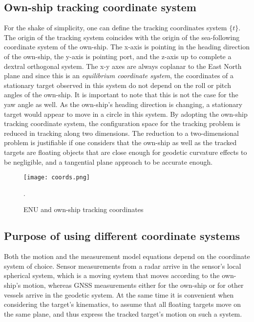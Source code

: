 \subsection{Own-ship tracking coordinate system}


For the shake of simplicity, one can define the tracking coordinates system $\{t\}$. The origin of the tracking system coincides with the origin of the sea-following coordinate system of the own-ship. The x-axis is pointing in the heading direction of the own-ship, the y-axis is pointing port, and the z-axis up to complete a dextral orthogonal system. The x-y axes are always coplanar to the East North plane and since this is an \emph{equilibrium coordinate system}, the coordinates of a stationary target observed in this system do not depend on the roll or pitch angles of the own-ship. It is important to note that this is not the case for the yaw angle as well. As the own-ship's heading direction is changing, a stationary target would appear to move in a circle in this system. By adopting the own-ship tracking coordinate system, the configuration space for the tracking problem is reduced in tracking along two dimensions. The reduction to a two-dimensional problem is justifiable if one considers that the own-ship as well as the tracked targets are floating objects that are close enough for geodetic curvature effects to be negligible, and a tangential plane approach to be accurate enough.




\begin{figure}[H] 	
	\centering
	\texttt{[image: coords.png]}
	\caption{ENU and own-ship tracking coordinates}.
	\label{fig:tracking_coords}	
\end{figure}

\subsection{Purpose of using different coordinate systems}

Both the motion and the measurement model equations depend on the coordinate system of choice. Sensor measurements from a radar arrive in the sensor's local spherical system, which is a moving system that moves according to the own-ship's motion, whereas GNSS measurements either for the own-ship or for other vessels arrive in the geodetic system. At the same time it is convenient when considering the target's kinematics, to assume that all floating targets move on the same plane, and thus express the tracked target's motion on such a system.


